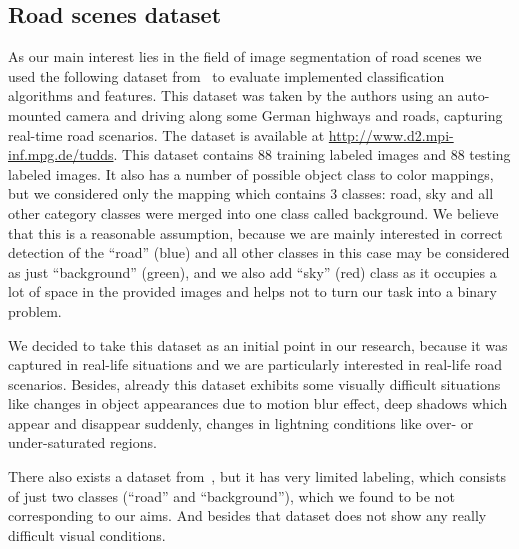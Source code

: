 \subsection{Road scenes dataset}
As our main interest lies in the field of image segmentation of road scenes we used the following dataset from~\cite{Wojek2008}
to evaluate implemented classification algorithms and features. This dataset was taken by the authors using an auto-mounted
camera and driving along some German highways and roads, capturing real-time road scenarios. The dataset is available at
\url{http://www.d2.mpi-inf.mpg.de/tudds}. This dataset contains 88 training labeled images and 88 testing labeled images.
It also has a number of possible object class to color mappings, but we considered only the mapping which contains 3 classes:
road, sky and all other category classes were merged into one class called background. We believe that this is a reasonable
assumption, because we are mainly interested in correct detection of the ``road'' (blue) and all other classes in this case 
may be
considered as just ``background'' (green), and we also add ``sky'' (red) class as it occupies a lot of space in the provided 
images and helps not to turn our task into a binary problem.

We decided to take this dataset as an initial point in our research, because it was captured in real-life situations and we are
particularly interested in real-life road scenarios. Besides, already this dataset exhibits some visually difficult situations
like changes in object appearances due to motion blur effect, deep shadows which appear and disappear suddenly, changes in
lightning conditions like over- or under-saturated regions.

There also exists a dataset from~\cite{Alvarez2010}, but it has very limited labeling, which consists of just
two classes (``road'' and ``background''), which we found to be not corresponding to our aims. And besides that dataset does not
show any really difficult visual conditions.

